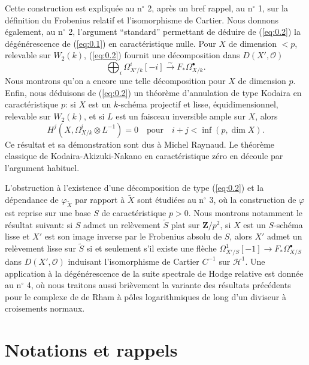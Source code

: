 \documentclass[12pt,a4paper]{article}
\theoremstyle{plain}
\theoremstyle{definition}
\theoremstyle{remark}
\newcommand{\cO}{\mathcal{O}}
\begin{document}
Cette construction est expliqu\'ee au n$^\circ$ 2, apr\`es un bref rappel, au n$^\circ$ 1, sur la
d\'efinition du Frobenius relatif et l'isomorphisme de Cartier. Nous donnons
\'egalement, au n$^\circ$ 2, l'argument ``standard'' permettant de d\'eduire de (\ref{eq:0.2}) la
d\'eg\'en\'erescence de (\ref{eq:0.1}) en caract\'eristique nulle. Pour $X$ de dimension $<p$,
relevable sur $W_2(k)$, (\ref{eq:0.2}) fournit une d\'ecomposition dans $D(X', \cO)$
\begin{equation}\label{eq:0.3}
\bigoplus_i \Omega^i_{X'/k}[-i] \xrightarrow{\sim} F_* \Omega^{\bullet}_{X/k}.
\end{equation}
Nous montrons qu'on a encore une telle d\'ecomposition pour $X$ de dimension $p$.
Enfin, nous d\'eduisons de (\ref{eq:0.2}) un th\'eor\`eme d'annulation de type Kodaira en
caract\'eristique $p$: si $X$ est un $k$-sch\'ema projectif et lisse, \'equidimensionnel,
relevable sur $W_2(k)$, et si $L$ est un faisceau inversible ample sur $X$, alors
\[
H^j(X, \Omega^i_{X/k} \otimes L^{-1}) = 0 \quad \text{pour} \quad i + j < \inf(p, \dim X).
\]
Ce r\'esultat et sa d\'emonstration sont dus \`a Michel Raynaud. Le th\'eor\`eme classique
de Kodaira-Akizuki-Nakano en caract\'eristique z\'ero en d\'ecoule par l'argument
habituel.

L'obstruction \`a l'existence d'une d\'ecomposition de type (\ref{eq:0.2}) et la d\'ependance
de $\varphi_{\tilde{X}}$ par rapport \`a $\tilde{X}$ sont \'etudi\'ees au n$^\circ$ 3, o\`u la construction de $\varphi$ est reprise sur
une base $S$ de caract\'eristique $p > 0$. Nous montrons notamment le r\'esultat suivant:
si $S$ admet un rel\`evement $\tilde{S}$ plat sur $\mathbf{Z}/p^2$, si $X$ est un $S$-sch\'ema lisse et $X'$ est son
image inverse par le Frobenius absolu de $S$, alors $X'$ admet un rel\`evement lisse sur
$\tilde{S}$ si et seulement s'il existe une fl\`eche $\Omega^1_{X'/S}[-1] \to F_* \Omega^{\bullet}_{X/S}$ dans $D(X', \cO)$ induisant
l'isomorphisme de Cartier $C^{-1}$ sur $\mathscr{H}^1$. Une application \`a la d\'eg\'en\'erescence de la
suite spectrale de Hodge relative est donn\'ee au n$^\circ$ 4, o\`u nous traitons aussi
bri\`evement la variante des r\'esultats pr\'ec\'edents pour le complexe de de Rham \`a
p\^oles logarithmiques de long d'un diviseur \`a croisements normaux.


\section{Notations et rappels}
\end{document}
